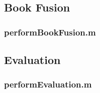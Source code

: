 \subsection{Book Fusion} \label{BookFusionCode}

\subsubsection{performBookFusion.m}\label{performBookFusionCode}


\subsection{Evaluation} \label{EvaluationCode}

\subsubsection{performEvaluation.m}\label{performEvaluationCode}





